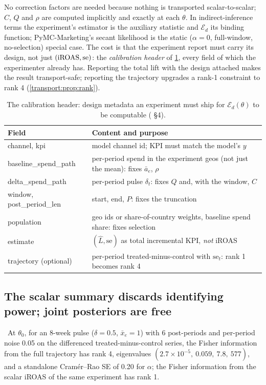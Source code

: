 No correction factors are needed because nothing is transported scalar-to-scalar; $C$, $Q$ and $\rho$ are computed implicitly and exactly at each $\theta$. In indirect-inference terms the experiment's estimator is the auxiliary statistic and $\mathcal E_d$ its binding function; PyMC-Marketing's secant likelihood is the static ($\alpha = 0$, full-window, no-selection) special case. The cost is that the experiment report must carry its design, not just $(\mathrm{iROAS}, \mathrm{se})$: the \emph{calibration header} of \cref{transport:tab:header}, every field of which the experimenter already has. Reporting the total lift with the design attached makes the result transport-safe; reporting the trajectory upgrades a rank-1 constraint to rank 4 (\cref{transport:prop:rank}).

\begin{table}[htbp]
\centering\small
\caption{The calibration header: design metadata an experiment must ship for $\mathcal E_d(\theta)$ to be computable ( \S4).}
\label{transport:tab:header}
\begin{tabularx}{\textwidth}{lX}
\toprule
Field & Content and purpose \\
\midrule
channel, kpi & model channel id; KPI must match the model's $y$ \\
baseline\_spend\_path & per-period spend in the experiment geos (not just the mean): fixes $\bar a_e$, $\rho$ \\
delta\_spend\_path & per-period pulse $\delta_t$: fixes $Q$ and, with the window, $C$ \\
window, post\_period\_len & start, end, $P$: fixes the truncation \\
population & geo ids or share-of-country weights, baseline spend share: fixes selection \\
estimate & $(\hat L, \mathrm{se})$ as total incremental KPI, \emph{not} iROAS \\
trajectory (optional) & per-period treated-minus-control with $\mathrm{se}_t$: rank 1 becomes rank 4 \\
\bottomrule
\end{tabularx}
\end{table}

\subsection{The scalar summary discards identifying power; joint posteriors are free}

\begin{proposition}
\label{transport:prop:rank}
\tagNumerical\ At $\theta_0$, for an 8-week pulse ($\delta = 0.5$, $\bar x_e = 1$) with 6 post-periods and per-period noise 0.05 on the differenced treated-minus-control series, the Fisher information from the full trajectory has rank 4, eigenvalues $(2.7\times10^{-5},\ 0.059,\ 7.8,\ 577)$, and a standalone Cram\'er--Rao SE of 0.20 for $\alpha$; the Fisher information from the scalar iROAS of the same experiment has rank 1.
\end{proposition}

